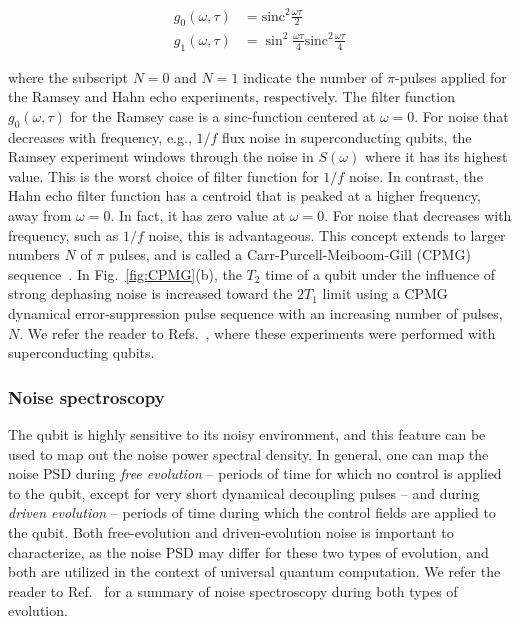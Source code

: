 \documentclass[aip,apr,twocolumn,showpacs,superscriptaddress,groupedaddress,nofootinbib,reprint]{revtex4-1}  %
\begin{document}
\begin{align}
g_0(\omega,\tau) &= \text{sinc}^2 \frac{\omega \tau}{2} \\
g_1(\omega,\tau) &= \sin^2 \frac{\omega \tau}{4} \text{sinc}^2 \frac{\omega \tau}{4}
\end{align}


\noindent where the subscript $N=0$ and $N=1$ indicate the number of $\pi$-pulses applied for the Ramsey and Hahn echo experiments, respectively. The filter function $g_0(\omega,\tau)$ for the Ramsey case is a sinc-function centered at $\omega=0$. For noise that decreases with frequency, e.g., $1/f$ flux noise in superconducting qubits, the Ramsey experiment windows through the noise in $S(\omega)$ where it has its highest value. This is the worst choice of filter function for $1/f$ noise. In contrast, the Hahn echo filter function has a centroid that is peaked at a higher frequency, away from $\omega=0$. In fact, it has zero value at $\omega=0$. For noise that decreases with frequency, such as $1/f$ noise, this is advantageous. This concept extends to larger numbers $N$ of $\pi$ pulses, and is called a Carr-Purcell-Meiboom-Gill (CPMG) sequence~\cite{Carr1954,Meiboom1958}. In Fig.~\ref{fig:CPMG}(b), the $T_2$ time of a qubit under the influence of strong dephasing noise is increased toward the $2T_1$ limit using a CPMG dynamical error-suppression pulse sequence with an increasing number of pulses, $N$. We refer the reader to Refs.~, where these experiments were performed with superconducting qubits.

\subsubsection{\label{sec:noise-spectroscopy}Noise spectroscopy}
The qubit is highly sensitive to its noisy environment, and this feature can be used to map out the noise power spectral density. In general, one can map the noise PSD during \textit{free evolution} -- periods of time for which no control is applied to the qubit, except for very short dynamical decoupling pulses -- and during \textit{driven evolution} -- periods of time during which the control fields are applied to the qubit. Both free-evolution and driven-evolution noise is important to characterize, as the noise PSD may differ for these two types of evolution, and both are utilized in the context of universal quantum computation. We refer the reader to Ref.~ for a summary of noise spectroscopy during both types of evolution.
\end{document}
